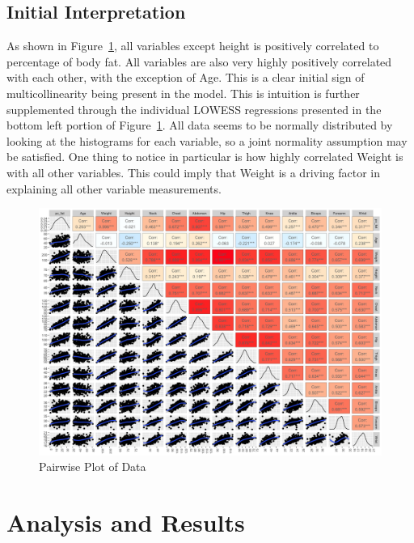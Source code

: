 \documentclass[letterpaper, 12pt]{article}
\begin{document}
	\subsection*{Initial Interpretation}
	As shown in Figure~\ref{fig:pairwise_plot}, all variables except height is positively correlated to percentage of body fat. All variables are also very highly positively correlated with each other, with the exception of Age.  This is a clear initial sign of multicollinearity being present in the model.  This is intuition is further supplemented through the individual LOWESS regressions presented in the bottom left portion of Figure~\ref{fig:pairwise_plot}.  All data seems to be normally distributed by looking at the histograms for each variable, so a joint normality assumption may be satisfied.  One thing to notice in particular is how highly correlated Weight is with all other variables.  This could imply that Weight is a driving factor in explaining all other variable measurements.
	
	\begin{figure}[!htbp]\centering
		\caption{Pairwise Plot of Data}
		\label{fig:pairwise_plot}
		\includegraphics[scale=.40]{pairwise_plot}
	\end{figure}

	\section{Analysis and Results}
	
\end{document}
